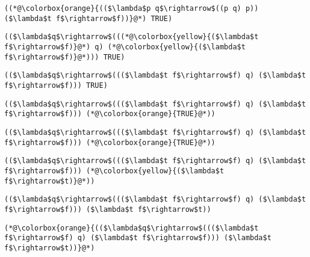 \documentclass{beamer}
\begin{document}
\begin{frame}[fragile]{\CurrentSection}
\lstset{basicstyle=\ttfamily\small}\lstset{numbers=none}\lstset{language=ML}\begin{lstlisting}
((*@\colorbox{orange}{(($\lambda$p q$\rightarrow$((p q) p)) ($\lambda$t f$\rightarrow$f))}@*) TRUE)
\end{lstlisting}
\pause\lstset{language=ML}\begin{lstlisting}
(($\lambda$q$\rightarrow$(((*@\colorbox{yellow}{($\lambda$t f$\rightarrow$f)}@*) q) (*@\colorbox{yellow}{($\lambda$t f$\rightarrow$f)}@*))) TRUE)
\end{lstlisting}

\end{frame}

\begin{frame}[fragile]{\CurrentSection}
\lstset{basicstyle=\ttfamily\small}\lstset{numbers=none}\lstset{language=ML}\begin{lstlisting}
(($\lambda$q$\rightarrow$((($\lambda$t f$\rightarrow$f) q) ($\lambda$t f$\rightarrow$f))) TRUE)
\end{lstlisting}
\pause\lstset{language=ML}\begin{lstlisting}
(($\lambda$q$\rightarrow$((($\lambda$t f$\rightarrow$f) q) ($\lambda$t f$\rightarrow$f))) (*@\colorbox{orange}{TRUE}@*))
\end{lstlisting}

\end{frame}

\begin{frame}[fragile]{\CurrentSection}
\lstset{basicstyle=\ttfamily\small}\lstset{numbers=none}\lstset{language=ML}\begin{lstlisting}
(($\lambda$q$\rightarrow$((($\lambda$t f$\rightarrow$f) q) ($\lambda$t f$\rightarrow$f))) (*@\colorbox{orange}{TRUE}@*))
\end{lstlisting}
\pause\lstset{language=ML}\begin{lstlisting}
(($\lambda$q$\rightarrow$((($\lambda$t f$\rightarrow$f) q) ($\lambda$t f$\rightarrow$f))) (*@\colorbox{yellow}{($\lambda$t f$\rightarrow$t)}@*))
\end{lstlisting}

\end{frame}

\begin{frame}[fragile]{\CurrentSection}
\lstset{basicstyle=\ttfamily\small}\lstset{numbers=none}\lstset{language=ML}\begin{lstlisting}
(($\lambda$q$\rightarrow$((($\lambda$t f$\rightarrow$f) q) ($\lambda$t f$\rightarrow$f))) ($\lambda$t f$\rightarrow$t))
\end{lstlisting}
\pause\lstset{language=ML}\begin{lstlisting}
(*@\colorbox{orange}{(($\lambda$q$\rightarrow$((($\lambda$t f$\rightarrow$f) q) ($\lambda$t f$\rightarrow$f))) ($\lambda$t f$\rightarrow$t))}@*)
\end{lstlisting}

\end{frame}
\end{document}
